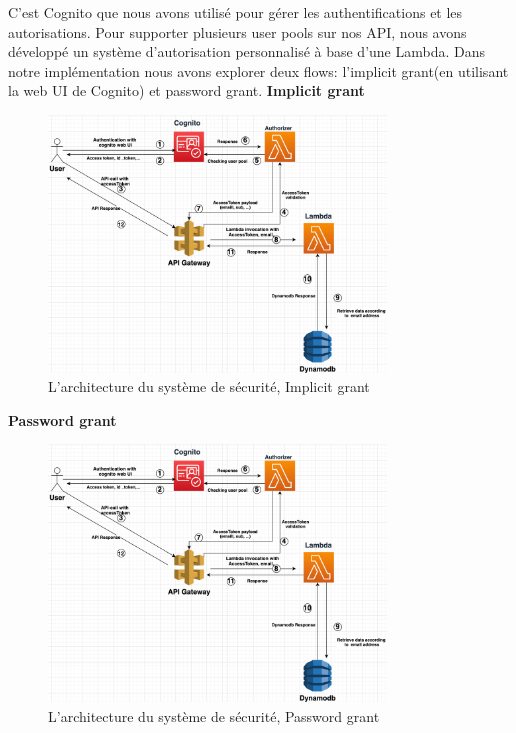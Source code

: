 C'est Cognito que nous avons utilisé pour gérer les authentifications et les autorisations. Pour supporter plusieurs user pools sur nos API, nous avons développé un système d'autorisation 
personnalisé à base d'une Lambda. Dans notre implémentation nous avons explorer deux flows: l'implicit grant(en utilisant la web UI de Cognito) et password grant.
\textbf{Implicit grant}
 \begin{figure}[!th]
            \centering
                \includegraphics[width=0.8\textwidth]{Figures/securite}
	       \decoRule
		\caption[L'architecture du système de sécurité, Implicit grant]{L'architecture du système de sécurité, Implicit grant}
	\label{fig:L'architecture du système de sécurité, Implicit grant}
	\end{figure}
\textbf{Password grant}
 \begin{figure}[!th]
            \centering
                \includegraphics[width=0.8\textwidth]{Figures/securite}
	       \decoRule
		\caption[L'architecture du système de sécurité, Password grant]{L'architecture du système de sécurité, Password grant}
	\label{fig:L'architecture du système de sécurité, Password grant}
	\end{figure}
\newpage
